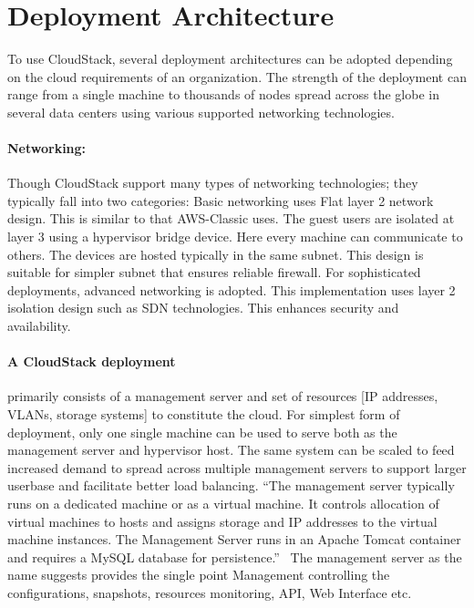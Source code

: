 \section{Deployment Architecture}

To use CloudStack, several deployment architectures can be adopted
depending on the cloud requirements of an organization. The strength
of the deployment can range from a single machine to thousands of
nodes spread across the globe in several data centers using various supported
networking technologies.

\paragraph {Networking:} Though CloudStack support many types of networking 
technologies; they typically fall into two categories: Basic networking uses 
Flat layer 2 network design. This is similar to that AWS-Classic uses. The
guest users are isolated at layer 3 using a hypervisor bridge device. Here 
every machine can communicate to others. The devices are hosted typically in 
the same subnet.  This design is suitable for simpler subnet that ensures 
reliable firewall. For sophisticated deployments, advanced networking is 
adopted. This implementation uses layer 2 isolation design such as SDN technologies.
This enhances security and availability.~\cite{hid-sp18-417-www-cloudstack-networking} 

\paragraph {A CloudStack deployment} primarily consists of a management server and
set of resources [IP addresses, VLANs, storage systems] to constitute
the cloud.  For simplest form of deployment, only one single machine
can be used to serve both as the management server and hypervisor
host. The same system can be scaled to feed increased demand to spread
across multiple management servers to support larger userbase and
facilitate better load balancing. ``The management server typically runs
on a dedicated machine or as a virtual machine. It controls allocation
of virtual machines to hosts and assigns storage and IP addresses to
the virtual machine instances. The Management Server runs in an Apache
Tomcat container and requires a MySQL database for
persistence.''~\cite{hid-sp18-417-www-cloudstack-management-server} 
The management server as the name suggests provides the single point 
Management controlling the configurations, snapshots, resources monitoring, 
API, Web Interface etc. 

